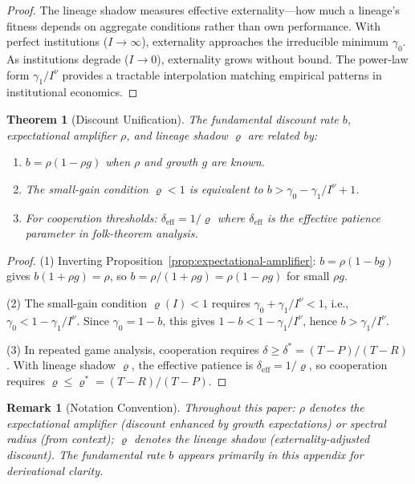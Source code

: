 \documentclass[12pt]{article}
\newtheorem{theorem}{Theorem}[section]
\newtheorem{remark}{Remark}[section]
\begin{document}
\begin{proof}
The lineage shadow measures effective externality---how much a lineage's fitness depends on aggregate conditions rather than own performance. With perfect institutions ($I \to \infty$), externality approaches the irreducible minimum $\gamma_0$. As institutions degrade ($I \to 0$), externality grows without bound. The power-law form $\gamma_1/I^\nu$ provides a tractable interpolation matching empirical patterns in institutional economics.
\end{proof}

\begin{theorem}[Discount Unification]
\label{thm:discount-unification}
The fundamental discount rate $b$, expectational amplifier $\rho$, and lineage shadow $\varrho$ are related by:
\begin{enumerate}
    \item $b = \rho(1 - \rho g)$ when $\rho$ and growth $g$ are known.
    \item The small-gain condition $\varrho < 1$ is equivalent to $b > \gamma_0 - \gamma_1/I^\nu + 1$.
    \item For cooperation thresholds: $\delta_{\text{eff}} = 1/\varrho$ where $\delta_{\text{eff}}$ is the effective patience parameter in folk-theorem analysis.
\end{enumerate}
\end{theorem}

\begin{proof}
(1) Inverting Proposition~\ref{prop:expectational-amplifier}: $b = \rho(1 - bg)$ gives $b(1 + \rho g) = \rho$, so $b = \rho/(1 + \rho g) = \rho(1 - \rho g)$ for small $\rho g$.

(2) The small-gain condition $\varrho(I) < 1$ requires $\gamma_0 + \gamma_1/I^\nu < 1$, i.e., $\gamma_0 < 1 - \gamma_1/I^\nu$. Since $\gamma_0 = 1 - b$, this gives $1 - b < 1 - \gamma_1/I^\nu$, hence $b > \gamma_1/I^\nu$.

(3) In repeated game analysis, cooperation requires $\delta \geq \delta^* = (T - P)/(T - R)$. With lineage shadow $\varrho$, the effective patience is $\delta_{\text{eff}} = 1/\varrho$, so cooperation requires $\varrho \leq \varrho^* = (T - R)/(T - P)$.
\end{proof}

\begin{remark}[Notation Convention]
Throughout this paper: $\rho$ denotes the expectational amplifier (discount enhanced by growth expectations) or spectral radius (from context); $\varrho$ denotes the lineage shadow (externality-adjusted discount). The fundamental rate $b$ appears primarily in this appendix for derivational clarity.
\end{remark}
\end{document}
